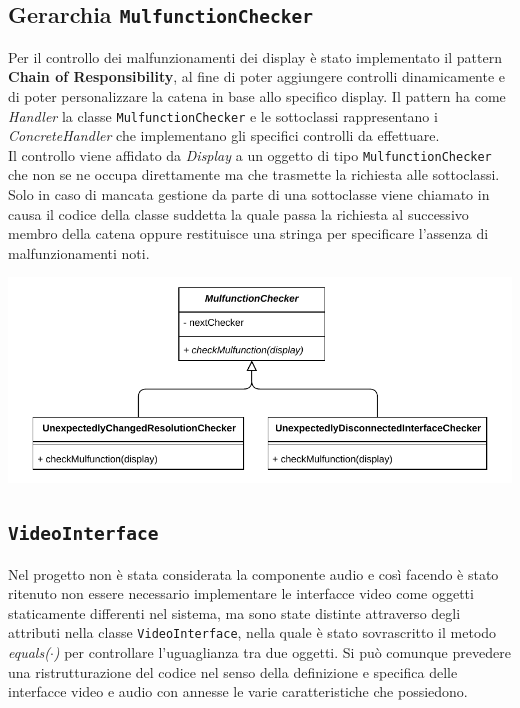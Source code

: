 \documentclass[a4paper,11pt]{article}
\begin{document}
	

	
	
	\subsection{Gerarchia \texttt{MulfunctionChecker}}
	Per il controllo dei malfunzionamenti dei display è stato implementato il pattern \textbf{Chain of Responsibility}, al fine di poter aggiungere controlli dinamicamente e di poter personalizzare la catena in base allo specifico display. Il pattern ha come \textit{Handler} la classe \texttt{MulfunctionChecker} e le sottoclassi rappresentano i \textit{ConcreteHandler} che implementano gli specifici controlli da effettuare.\\
	Il controllo viene affidato da \textit{Display} a un oggetto di tipo \texttt{MulfunctionChecker} che non se ne occupa direttamente ma che trasmette la richiesta alle sottoclassi. Solo in caso di mancata gestione da parte di una sottoclasse viene chiamato in causa il codice della classe suddetta la quale passa la richiesta al successivo membro della catena oppure restituisce una stringa per specificare l'assenza di malfunzionamenti noti.\\
		\begin{minipage}[c]{.5\textwidth}
		\centering
		\includegraphics[width=\textwidth]{diagramma/ClassDiagramm-MulfunctionChecker.pdf}
		\label{fig:mulfunction}
	\end{minipage}
	
	\subsection{\texttt{VideoInterface}}
	Nel progetto non è stata considerata la componente audio e così facendo è stato ritenuto non essere necessario implementare le interfacce video come oggetti staticamente differenti nel sistema, ma sono state distinte attraverso degli attributi nella classe \texttt{VideoInterface}, nella quale è stato sovrascritto il metodo \textit{equals($\cdot$)} per controllare l'uguaglianza tra due oggetti. Si può comunque prevedere una ristrutturazione del codice nel senso della definizione e specifica delle interfacce video e audio con annesse le varie caratteristiche che possiedono.\\
	
\end{document}
